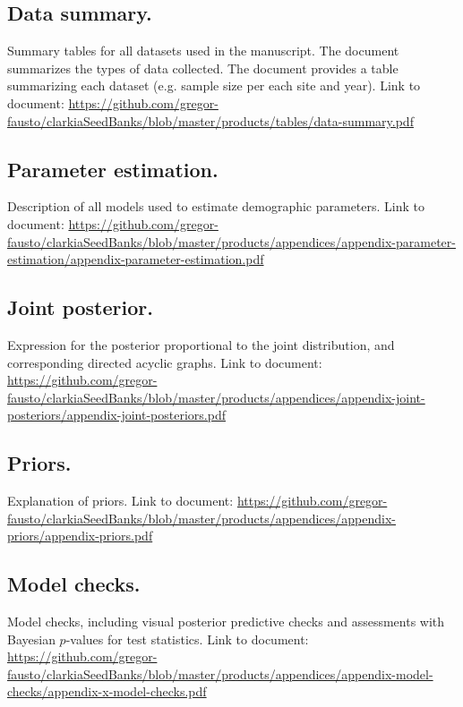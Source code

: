 \documentclass[12pt, oneside, titlepage]{article}   	%
\begin{document}
\subsection*{Data summary.} Summary tables for all datasets used in the manuscript. The document summarizes the types of data collected. The document provides a table summarizing each dataset (e.g. sample size per each site and year). Link to document: \url{https://github.com/gregor-fausto/clarkiaSeedBanks/blob/master/products/tables/data-summary.pdf}

\subsection*{Parameter estimation.} Description of all models used to estimate demographic parameters. Link to document: \url{https://github.com/gregor-fausto/clarkiaSeedBanks/blob/master/products/appendices/appendix-parameter-estimation/appendix-parameter-estimation.pdf}

\subsection*{Joint posterior.} Expression for the posterior proportional to the joint distribution, and corresponding directed acyclic graphs. Link to document: \url{https://github.com/gregor-fausto/clarkiaSeedBanks/blob/master/products/appendices/appendix-joint-posteriors/appendix-joint-posteriors.pdf}

\subsection*{Priors.} Explanation of priors. Link to document: \url{https://github.com/gregor-fausto/clarkiaSeedBanks/blob/master/products/appendices/appendix-priors/appendix-priors.pdf}

\subsection*{Model checks.} Model checks, including visual posterior predictive checks and assessments with Bayesian $p$-values for test statistics. Link to document: \url{https://github.com/gregor-fausto/clarkiaSeedBanks/blob/master/products/appendices/appendix-model-checks/appendix-x-model-checks.pdf}
\end{document}
